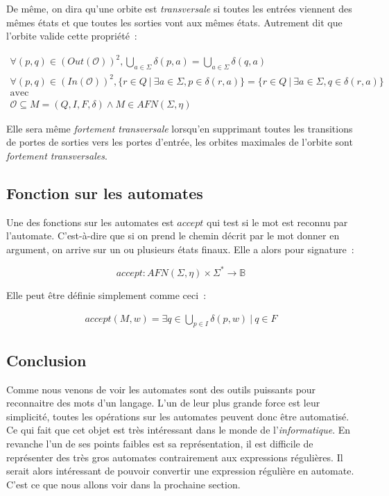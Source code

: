 \begin{definition}
    De même, on dira qu'une orbite est \textit{transversale} si toutes les
    entrées viennent des mêmes états et que toutes les sorties vont aux mêmes
    états. Autrement dit que l'orbite valide cette propriété~:

    \begin{gather*}
        \forall (p, q) \in (Out(\mathcal{O}))^2, \bigcup_{a \in \Sigma} \delta(p, a) = \bigcup_{a \in \Sigma} \delta(q, a) \\
        \forall (p, q) \in (In(\mathcal{O}))^2, \{r \in Q ~|~ \exists a \in \Sigma, p \in \delta(r, a)\} = \{r \in Q ~|~ \exists a \in \Sigma, q \in \delta(r, a)\} \\
        \text{avec} \\
        \mathcal{O} \subseteq M = (Q, I, F, \delta) \land M \in AFN(\Sigma, \eta)
    \end{gather*}

    \noindent Elle sera même \textit{fortement transversale} lorsqu'en
    supprimant toutes les transitions de portes de sorties vers les portes
    d'entrée, les orbites maximales de l'orbite sont
    \textit{fortement transversales}.
\end{definition}

\subsection{Fonction sur les automates}

Une des fonctions sur les automates est \(accept\) qui test si le mot est
reconnu par l'automate. C'est-à-dire que si on prend le chemin décrit par le
mot donner en argument, on arrive sur un ou plusieurs états finaux. Elle a
alors pour signature~:

\[
    accept: AFN(\Sigma, \eta) \times \Sigma^* \to \mathbb{B}
\]

Elle peut être définie simplement comme ceci~:

\begin{align*}
    accept(M, w) = \exists q \in \bigcup_{p \in I} \delta(p, w) ~|~ q \in F
\end{align*}

\subsection{Conclusion}

Comme nous venons de voir les automates sont des outils puissants pour
reconnaitre des mots d'un langage. L'un de leur plus grande force est leur
simplicité, toutes les opérations sur les automates peuvent donc être
automatisé. Ce qui fait que cet objet est très intéressant dans le monde de
l'\textit{informatique}. En revanche l'un de ses points faibles est sa
représentation, il est difficile de représenter des très gros automates
contrairement aux expressions régulières. Il serait alors intéressant de
pouvoir convertir une expression régulière en automate. C'est ce que nous
allons voir dans la prochaine section.